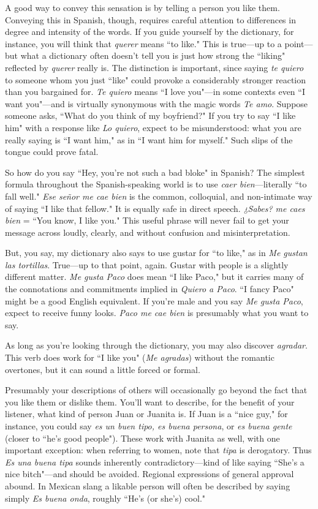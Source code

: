 A good way to convey this sensation is by telling a person you
like them. Conveying this in Spanish, though, requires careful attention to differences in degree and intensity of the words. If you guide
yourself by the dictionary, for instance, you will think that \emph{querer}
means ``to like." This is true---up to a point---but what a dictionary
often doesn't tell you is just how strong the ``liking" reflected by
\emph{querer} really is. The distinction is important, since saying \emph{te quiero} to
someone whom you just ``like" could provoke a considerably stronger
reaction than you bargained for. \emph{Te quiero} means ``I love you"---in
some contexts even ``I want you"---and is virtually synonymous with
the magic words \emph{Te amo}. Suppose someone asks, ``What do you think
of my boyfriend?" If you try to say ``I like him" with a response like \emph{Lo
quiero}, expect to be misunderstood: what you are really saying is ``I
want him," as in ``I want him for myself." Such slips of the tongue
could prove fatal.

So how do you say ``Hey, you're not such a bad bloke" in Spanish? The simplest formula throughout the Spanish-speaking world is to
use \emph{caer bien}---literally ``to fall well." \emph{Ese señor me cae bien} is the common, colloquial, and non-intimate way of saying ``I like that fellow." It
is equally safe in direct speech. \emph{¿Sabes? me caes bien} = ``You know, I
like you." This useful phrase will never fail to get your message across
loudly, clearly, and without confusion and misinterpretation.

But, you say, my dictionary also says to use gustar for ``to
like," as in \emph{Me gustan las tortillas}. True---up to that point, again. Gustar with people is a slightly different matter. \emph{Me gusta Paco} does mean
``I like Paco," but it carries many of the connotations and commitments implied in \emph{Quiero a Paco}. ``I fancy Paco" might be a good English equivalent. If you're male and you say \emph{Me gusta Paco}, expect to
receive funny looks. \emph{Paco me cae bien} is presumably what you want
to say.

As long as you're looking through the dictionary, you may also
discover \emph{agradar}. This verb does work for ``I like you" (\emph{Me agradas})
without the romantic overtones, but it can sound a little forced or
formal.

Presumably your descriptions of others will occasionally go
beyond the fact that you like them or dislike them. You'll want to
describe, for the benefit of your listener, what kind of person Juan or
Juanita is. If Juan is a ``nice guy," for instance, you could say \emph{es un
buen tipo, es buena persona}, or \emph{es buena gente} (closer to ``he's good
people"). These work with Juanita as well, with one important exception: when referring to women, note that \emph{tipa} is derogatory. Thus \emph{Es
una buena tipa} sounds inherently contradictory---kind of like saying
``She's a nice bitch"---and should be avoided. Regional expressions
of general approval abound. In Mexican slang a likable person will often be described by saying simply \emph{Es buena onda}, roughly ``He's (or
she's) cool."

